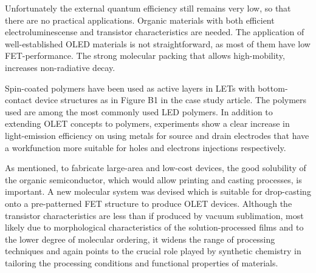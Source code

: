 Unfortunately the external quantum efficiency still remains very low, so that there are no practical applications. Organic materials with both efficient electroluminescense and transistor characteristics are needed. The application of well-established OLED materials is not straightforward, as most of them have low FET-performance. The strong molecular packing that allows high-mobility, increases non-radiative decay.

Spin-coated polymers have been used as active layers in LETs with bottom-contact device structures as in Figure B1 in the case study article. The polymers used are among the most commonly used LED polymers. In addition to extending OLET concepts to polymers, experiments show a clear increase in light-emission efficiency on using metals for source and drain electrodes that have a workfunction more suitable for holes and electrons injections respectively.

As mentioned, to fabricate large-area and low-cost devices, the good solubility of the organic semiconductor, which would allow printing and casting processes, is important. A new molecular system was devised which is suitable for drop-casting onto a pre-patterned FET structure to produce OLET devices. Although the transistor characteristics are less than if produced by vacuum sublimation, most likely due to morphological characteristics of the solution-processed films and to the lower degree of molecular ordering, it widens the range of processing techniques and again points to the crucial role played by synthetic chemistry in tailoring the processing conditions and functional properties of materials.